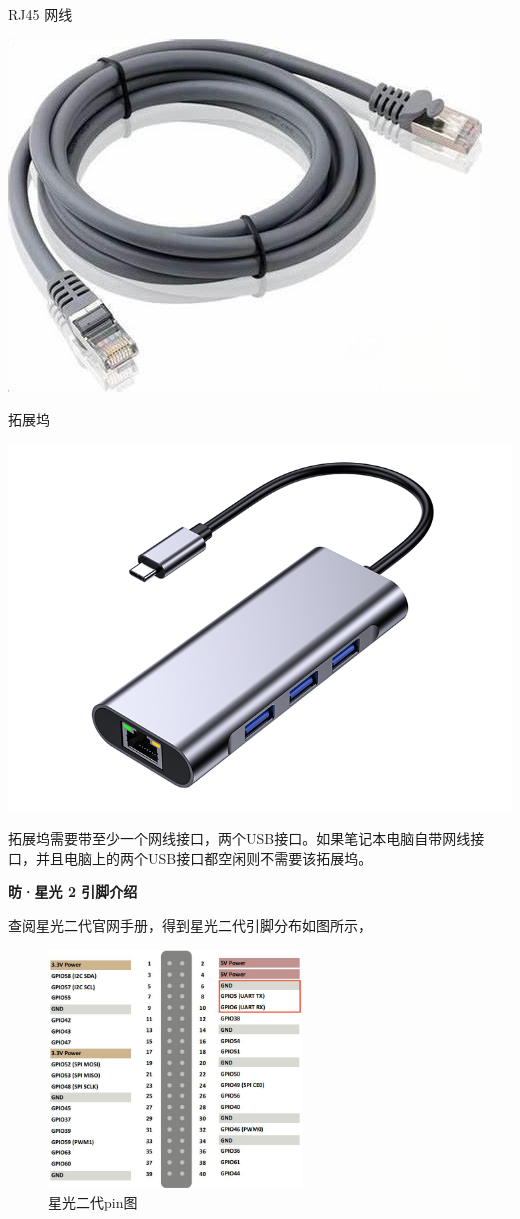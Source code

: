 {	\raggedright
	\setlength{\parindent}{2em}
	 RJ45 网线
	
	\centering
	\includegraphics[width=0.5\linewidth]{figures/08-03-RJ45网线.jpg}
	
	\raggedright
	\setlength{\parindent}{2em}
	 拓展坞
	
	\centering
	\includegraphics[width=0.5\linewidth]{figures/08-02-拓展坞.jpg}
	
	\raggedright
	\setlength{\parindent}{2em}
	拓展坞需要带至少一个网线接口，两个USB接口。如果笔记本电脑自带网线接口，并且电脑上的两个USB接口都空闲则不需要该拓展坞。
}

\textbf{昉·星光 2 引脚介绍}

查阅星光二代官网手册，得到星光二代引脚分布如图所示，
\begin{figure}[ht]
	\centering
	\includegraphics[width=0.6\textwidth]{figures/08-02-星光二代pin图.jpg}
	\caption{星光二代pin图}
\end{figure}

